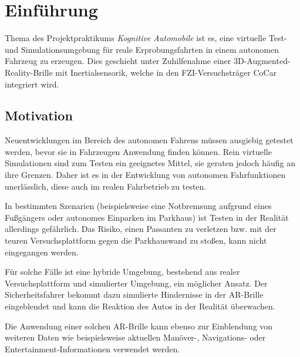 
\section{Einführung}
\label{einleitung_sec}

Thema des Projektpraktikums \emph{Kognitive Automobile} ist es, eine virtuelle Test- und Simulationsumgebung für reale Erprobungsfahrten in einem autonomen Fahrzeug zu erzeugen.
Dies geschieht unter Zuhilfenahme einer 3D-Augmented-Reality-Brille mit Inertialsensorik, welche in den \ac{FZI}-Versuchsträger CoCar integriert wird.


\subsection{Motivation}
\label{einleitung_motivation_subsec}


Neuentwicklungen im Bereich des autonomen Fahrens müssen ausgiebig getestet werden, bevor sie in Fahrzeugen Anwendung finden können.
Rein virtuelle Simulationen sind zum Testen ein geeignetes Mittel, sie geraten jedoch häufig an ihre Grenzen.
Daher ist es in der Entwicklung von autonomen Fahrfunktionen unerlässlich, diese auch im realen Fahrbetrieb zu testen.

In bestimmten Szenarien (beispielsweise eine Notbremsung aufgrund eines Fußgängers oder autonomes Einparken im Parkhaus) ist Testen in der Realität allerdings gefährlich.
Das Risiko, einen Passanten zu verletzen bzw. mit der teuren Versuchsplattform gegen die Parkhauswand zu stoßen, kann nicht eingegangen werden.

Für solche Fälle ist eine hybride Umgebung, bestehend aus realer Versuchsplattform und simulierter Umgebung, ein möglicher Ansatz.
Der Sicherheitsfahrer bekommt dazu simulierte Hindernisse in der \ac{AR}-Brille eingeblendet und kann die Reaktion des Autos in der Realität überwachen.

Die Anwendung einer solchen \ac{AR}-Brille kann ebenso zur Einblendung von weiteren Daten wie beispielsweise aktuellen Manöver-, Navigations- oder Entertainment-Informationen verwendet werden.



